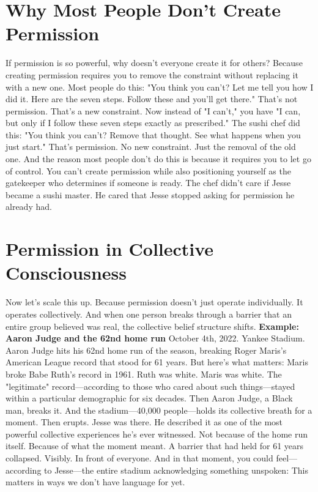 \documentclass[12pt,openany]{book}
\begin{document}
\section{Why Most People Don't Create Permission}

If permission is so powerful, why doesn't everyone create it for others?
Because creating permission requires you to remove the constraint without replacing it with a new one.
Most people do this:
"You think you can't? Let me tell you how I did it. Here are the seven steps. Follow these and you'll get there."
That's not permission. That's a new constraint.
Now instead of "I can't," you have "I can, but only if I follow these seven steps exactly as prescribed."
The sushi chef did this:
"You think you can't? Remove that thought. See what happens when you just start."
That's permission. No new constraint. Just the removal of the old one.
And the reason most people don't do this is because it requires you to let go of control. You can't create permission while also positioning yourself as the gatekeeper who determines if someone is ready.
The chef didn't care if Jesse became a sushi master. He cared that Jesse stopped asking for permission he already had.

\section{Permission in Collective Consciousness}

Now let's scale this up.
Because permission doesn't just operate individually. It operates collectively. And when one person breaks through a barrier that an entire group believed was real, the collective belief structure shifts.
\textbf{Example: Aaron Judge and the 62nd home run}
October 4th, 2022. Yankee Stadium. Aaron Judge hits his 62nd home run of the season, breaking Roger Maris's American League record that stood for 61 years.
But here's what matters: Maris broke Babe Ruth's record in 1961.
Ruth was white. Maris was white. The "legitimate" record—according to those who cared about such things—stayed within a particular demographic for six decades.
Then Aaron Judge, a Black man, breaks it.
And the stadium—40,000 people—holds its collective breath for a moment. Then erupts.
Jesse was there. He described it as one of the most powerful collective experiences he's ever witnessed. Not because of the home run itself. Because of what the moment meant.
A barrier that had held for 61 years collapsed. Visibly. In front of everyone.
And in that moment, you could feel—according to Jesse—the entire stadium acknowledging something unspoken: This matters in ways we don't have language for yet.
\end{document}
